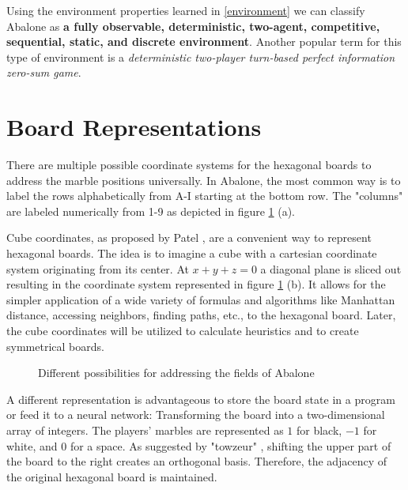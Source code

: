 Using the environment properties learned in \ref{environment} we can classify Abalone as \textbf{a fully observable, deterministic, two-agent, competitive, sequential, static, and discrete environment}. Another popular term for this type of environment is a \textit{deterministic two-player turn-based perfect information zero-sum game}.

\section{Board Representations}
\label{board_representations}

There are multiple possible coordinate systems for the hexagonal boards to address the marble positions universally. In Abalone, the most common way is to label the rows alphabetically from A-I starting at the bottom row. The "columns" are labeled numerically from 1-9 as depicted in figure \ref{abalone_coordinate_systems} (a).

Cube coordinates, as proposed by Patel \cite{noauthor_red_nodate}, are a convenient way to represent hexagonal boards. The idea is to imagine a cube with a cartesian coordinate system originating from its center. At $x + y + z = 0$ a diagonal plane is sliced out resulting in the coordinate system represented in figure \ref{abalone_coordinate_systems} (b). It allows for the simpler application of a wide variety of formulas and algorithms like Manhattan distance, accessing neighbors, finding paths, etc., to the hexagonal board. Later, the cube coordinates will be utilized to calculate heuristics and to create symmetrical boards.

\begin{figure}[!h]
    \centering
    \caption{Different possibilities for addressing the fields of Abalone}
    \label{abalone_coordinate_systems}
\end{figure}

A different representation is advantageous to store the board state in a program or feed it to a neural network: Transforming the board into a two-dimensional array of integers. The players' marbles are represented as $1$ for black, $-1$ for white, and 0 for a space. As suggested by "towzeur" \cite{towzeur_towzeurgym-abalone_2021}, shifting the upper part of the board to the right creates an orthogonal basis. Therefore, the adjacency of the original hexagonal board is maintained.

